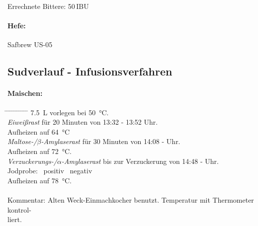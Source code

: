 \documentclass[12pt,oneside,a4paper]{scrartcl}
\begin{document}
\vspace{.25cm}
\hspace{1cm}Errechnete Bittere: 50\,IBU
%
\paragraph{Hefe:}
	Safbrew US-05

%
\subsection*{Sudverlauf - Infusionsverfahren}	

\paragraph{Maischen:}
	\begin{tabbing}\hspace{1cm} \=
		\hspace{1cm} \= \hspace{1cm} \=\hspace{1cm} \=\hspace{1cm} \=\hspace{1cm} \= \hspace{1cm} \= \hspace{1cm} \= \hspace{1cm} \= \hspace{1cm} \= \kill
		\> \SI{7,5}{\liter} vorlegen bei \SI{50}{\celsius}.\\
		\> \textit{Eiweißrast} für 20 Minuten von 13:32 - 13:52 Uhr.\\
		\> \> Aufheizen auf \SI{64}{\celsius}\\
		\> \textit{Maltose-/$\beta$-Amylaserast} für 30 Minuten von 14:08 - Uhr.\\
		\> \> Aufheizen auf \SI{72}{\celsius}.\\
		\> \textit{Verzuckerungs-/$\alpha$-Amylaserast} bis zur Verzuckerung von 14:48 - Uhr.\\
		\> \> \> Jodprobe: \> \> \Square \ positiv \> \> \Square \ negativ\\
		\> \> Aufheizen auf \SI{78}{\celsius}.\\\\
		\> Kommentar: \>\>\> Alten Weck-Einmachkocher benutzt. Temperatur mit Thermometer kontrol-\\
		\>\>\>liert. \\
	\end{tabbing}
\end{document}
